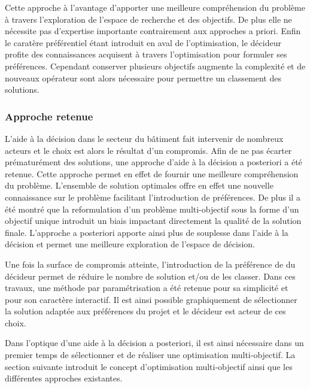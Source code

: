 
Cette approche à l’avantage d’apporter une meilleure compréhension du problème à
travers l’exploration de l’espace de recherche et des objectifs.
De plus elle ne nécessite pas d’expertise importante contrairement aux approches a priori.
Enfin le caratère préférentiel étant introduit en aval de l’optimisation, le décideur
profite des connaissances acquisent à travers l’optimisation pour formuler ses préférences.
Cependant conserver plusieurs objectifs augmente la complexité et de nouveaux opérateur
sont alors nécessaire pour permettre un classement des solutions.

\subsubsection{Approche retenue} %
\label{ssub:approche_retenue}
L’aide à la décision dans le secteur du bâtiment fait intervenir de nombreux acteurs
et le choix est alors le résultat d’un compromis. Afin de ne pas écarter prématurément
des solutions, une approche d’aide à la décision a posteriori a été retenue. Cette approche
permet en effet de fournir une meilleure compréhension du problème. L’ensemble
de solution optimales offre en effet une nouvelle connaissance sur le problème
facilitant l’introduction de préférences.
De plus il a été montré que la reformulation d’un problème multi-objectif sous la
forme d’un objectif unique introduit un biais impactant directement la qualité de
la solution finale. L’approche a posteriori apporte ainsi plus de souplesse dans
l’aide à la décision et permet une meilleure exploration de l’espace de décision.

Une fois la surface de compromis atteinte, l’introduction de la préférence de
du décideur permet de réduire le nombre de solution et/ou de les classer.
Dans ces travaux, une méthode par paramétrisation a été retenue pour sa simplicité
et pour son caractère interactif. Il est ainsi possible graphiquement de sélectionner
la solution adaptée aux préférences du projet et le décideur est acteur de ces choix.

Dans l’optique d’une aide à la décision a posteriori, il est ainsi nécessaire
dans un premier temps de sélectionner et de réaliser une optimisation multi-objectif.
La section suivante introduit le concept d’optimisation multi-objectif ainsi que
les différentes approches existantes.

